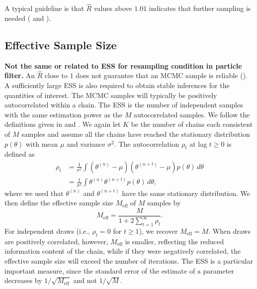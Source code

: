 A typical guideline is that $\widehat{R}$ values above $1.01$ indicates that further sampling is needed (\cite{Stan} and \cite{ImprovedhatR}).

\subsection*{Effective Sample Size} %
\textbf{Not the same or related to ESS for resampling condition in particle filter.}\newline
An $\widehat{R}$ close to $1$ does not guarantee that an MCMC sample is reliable (\cite{VatsKnudson}). A sufficiently large \gls*{ESS} is also required to obtain stable inferences for the quantities of interest. The MCMC samples will typically be positively autocorrelated within a chain. The \gls*{ESS} is the number of independent samples with the same estimation power as the $M$ autocorrelated samples. We follow the definitions given in \cite{Stan} and \cite{ImprovedhatR}.
We again let $K$ be the number of chains each consistent of $M$ samples and assume all the chains have reached the stationary distribution $p(\theta)$ with mean $\mu$ and variance $\sigma^2$. The autocorrelation $\rho_t$ at lag $t\geq 0$ is defined as
\begin{align*}
	\rho_t&=\frac{1}{\sigma^2}\int (\theta^{(n)}-\mu)(\theta^{(n+t)}-\mu)p(\theta)\, d\theta \\
	&=\frac{1}{\sigma^2}\int \theta^{(n)}\theta^{(n+t)}p(\theta)\, d\theta,
\end{align*}
where we used that $\theta^{(n)}$ and $\theta^{(n+t)}$ have the same stationary distribution. We then define the effective sample size $M_{\text{eff}}$ of $M$ samples by
\[
	M_{\text{eff}}=\frac{M}{1+2\sum_{t=1}^{\infty}\rho_t}.
\]
For independent draws (i.e., \(\rho_t = 0\) for \(t \ge 1\)), we recover \(M_{\text{eff}}=M\). 
When draws are positively correlated, however, \(M_{\text{eff}}\) is smaller, reflecting the reduced information content of the chain, while if they were negatively correlated, the effective sample size will exceed the number of iterations. The \gls*{ESS} is a particular important measure, since the standard error of the estimate of a parameter decreases by $1/\sqrt{M_\text{eff}}$ and not $1/\sqrt{M}$.
 
